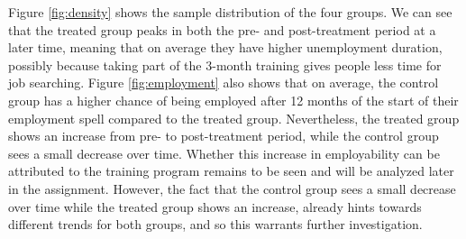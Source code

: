 \documentclass{scrartcl}
\begin{document}
Figure \ref{fig:density} shows the sample distribution of the four groups. We can see that the treated group peaks in both the pre- and post-treatment period at a later time, meaning that on average they have higher unemployment duration, possibly because taking part of the 3-month training gives people less time for job searching. Figure \ref{fig:employment} also shows that on average, the control group has a higher chance of being employed after 12 months of the start of their employment spell compared to the treated group. Nevertheless, the treated group shows an increase from pre- to post-treatment period, while the control group sees a small decrease over time. Whether this increase in employability can be attributed to the training program remains to be seen and will be analyzed later in the assignment. However, the fact that the control group sees a small decrease over time while the treated group shows an increase, already hints towards different trends for both groups, and so this warrants further investigation. \\ 
\end{document}
